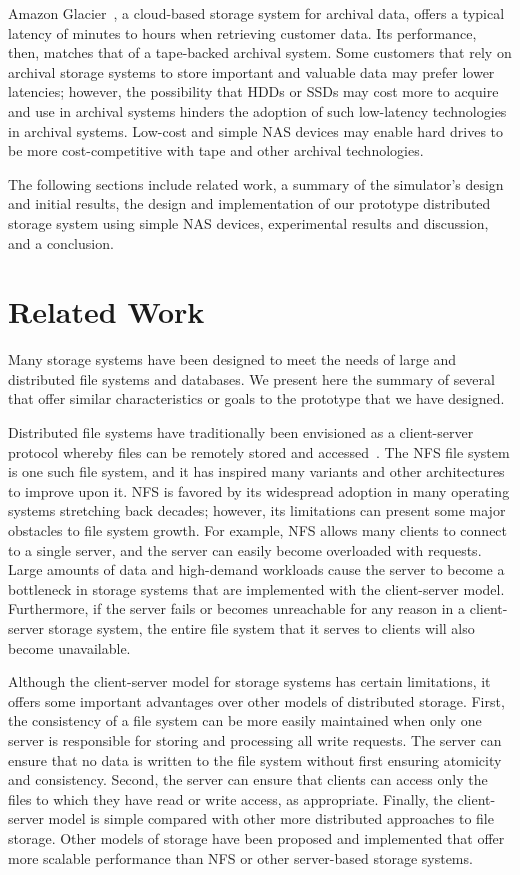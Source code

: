 Amazon Glacier~\cite{web6}, a cloud-based storage system for archival data, offers a typical latency of minutes to hours when retrieving customer data.  Its performance, then, matches that of a tape-backed archival system.  Some customers that rely on archival storage systems to store important and valuable data may prefer lower latencies; however, the possibility that HDDs or SSDs may cost more to acquire and use in archival systems hinders the adoption of such low-latency technologies in archival systems.  Low-cost and simple NAS devices may enable hard drives to be more cost-competitive with tape and other archival technologies.

The following sections include related work, a summary of the simulator's design and initial results, the design and implementation of our prototype distributed storage system using simple NAS devices, experimental results and discussion, and a conclusion.

\section{Related Work}
Many storage systems have been designed to meet the needs of large and distributed file systems and databases.  We present here the summary of several that offer similar characteristics  or goals to the prototype that we have designed.

Distributed file systems have traditionally been envisioned as a client-server protocol whereby files can be remotely stored and accessed~\cite{Sandberg85designand}.  The NFS file system is one such file system, and it has inspired many variants and other architectures to improve upon it.  NFS is favored by its widespread adoption in many operating systems stretching back decades; however, its limitations can present some major obstacles to file system growth.  For example, NFS allows many clients to connect to a single server, and the server can easily become overloaded with requests.  Large amounts of data and high-demand workloads cause the server to become a bottleneck in storage systems that are implemented with the client-server model.  Furthermore, if the server fails or becomes unreachable for any reason in a client-server storage system, the entire file system that it serves to clients will also become unavailable.

Although the client-server model for storage systems has certain limitations, it offers some important advantages over other models of distributed storage.  First, the consistency of a file system can be more easily maintained when only one server is responsible for storing and processing all write requests.  The server can ensure that no data is written to the file system without first ensuring atomicity and consistency.  Second, the server can ensure that clients can access only the files to which they have read or write access, as appropriate.  Finally, the client-server model is simple compared with other more distributed approaches to file storage.  Other models of storage have been proposed and implemented that offer more scalable performance than NFS or other server-based storage systems.

